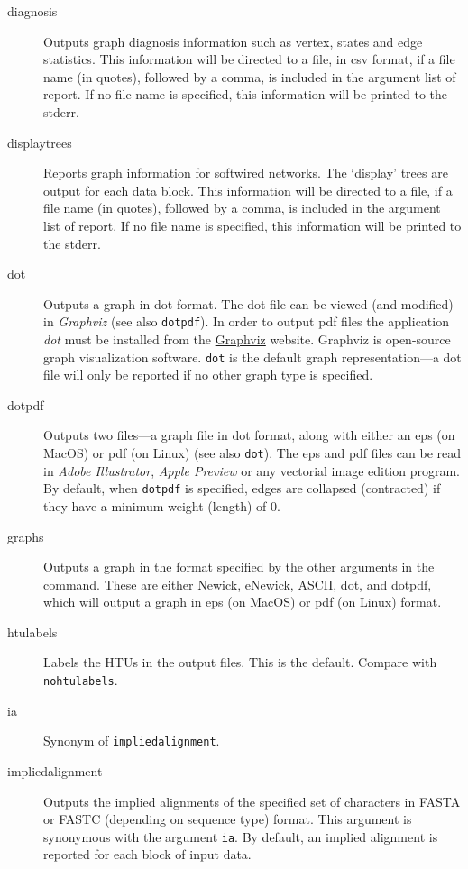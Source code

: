 \begin{description}
		\item[diagnosis] Outputs graph diagnosis information such as vertex, states 
		and edge statistics. This information will be directed to a file, in csv format, if a 
		file name (in quotes), followed by a comma, is included in the argument list of 
		report. If no file name is specified, this information will be printed to the stderr.
		
		\item[displaytrees] Reports graph information for softwired networks. The 
		`display' trees are output for each data block. This information will be directed 
		to a file, if a file name (in quotes), followed by a comma, is included in the 
		argument list of report. If no file name is specified, this information 
		will be printed to the stderr.
		
		\item[dot] Outputs a graph in dot format. The dot file can be viewed (and 
		modified) in \textit{Graphviz} (see also \texttt{dotpdf}). In order to output pdf 
		files the application \textit{dot} must be installed from the 
		\href{https://graphviz.org/download/}{Graphviz} 	website. Graphviz is 
		open-source graph visualization software. \texttt{dot} is the default graph 
		representation---a dot file will only be reported if no other graph type is specified. 
		
		\item[dotpdf] Outputs two files---a graph file in dot format, along with either
		an eps (on MacOS) or pdf (on Linux) (see also \texttt{dot}). The eps and pdf 
		files can be read in \textit{Adobe Illustrator}, \textit{Apple Preview} or any 
		vectorial image edition program.  By default, when \texttt{dotpdf} is specified,
		edges are collapsed (contracted) if they have a minimum weight (length) of 0.
		
		\item[graphs] Outputs a graph in the format specified by the other arguments 
		in the command. These are either Newick, eNewick, ASCII, dot, and dotpdf, 
		which will output a graph in eps (on MacOS) or pdf (on Linux) format.
		
		\item[htulabels] Labels the HTUs in the output files. This is the default. Compare 
		with \texttt{nohtulabels}.
		
		\item[ia] Synonym of \texttt{impliedalignment}.
		
		\item[impliedalignment] Outputs the implied alignments of the specified 
		set of characters in FASTA or FASTC (depending on sequence type) format. 
		This argument is synonymous with the argument \texttt{ia}. By default, 
		an implied alignment is reported for each block of input data. 
		

\end{description}
